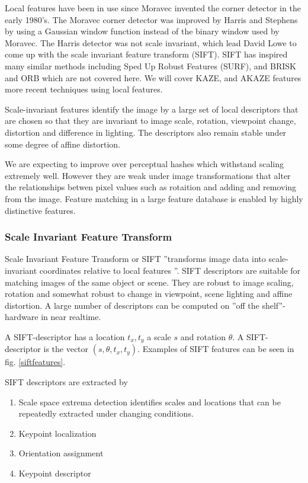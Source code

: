 \documentclass[english,12pt,a4paper,pdftex,elec,utf8]{aaltothesis}
\begin{document}
Local features have been in use since Moravec invented the corner detector in the early 1980's. The Moravec corner detector was improved by Harris and Stephens by using a Gaussian window function instead of the binary window used by Moravec. The Harris detector was not scale invariant, which lead David Lowe to come up with the scale invariant feature transform (SIFT). SIFT has inspired many similar methods including Sped Up Robust Features (SURF), and BRISK and ORB which are not covered here. We will cover KAZE, and AKAZE features more recent techniques using local features.

Scale-invariant features identify the image by a large set of local descriptors that are chosen so that they are invariant to image scale, rotation, viewpoint change, distortion and difference in lighting. The descriptors also remain stable under some degree of affine distortion. \cite{Lowe2004}

We are expecting to improve over perceptual hashes which withstand scaling extremely well. However they are weak under image transformations that alter the relationships betwen pixel values such as rotaition and adding and removing from the image. Feature matching in a large feature database is enabled by highly distinctive features.

\subsubsection{Scale Invariant Feature Transform}
Scale Invariant Feature Transform or SIFT ''transforms image data into scale-invariant coordinates relative to local features \cite{Lowe2004}''. SIFT descriptors are suitable for matching images of the same object or scene. They are robust to image scaling, rotation and somewhat robust to change in viewpoint, scene lighting and affine distortion. A large number of descriptors can be computed on ''off the shelf''-hardware in near realtime. \cite{Lowe2004}

A SIFT-descriptor has a location $t_x, t_y$ a scale $s$ and rotation $\theta$. A SIFT-descriptor is the vector $(s, \theta, t_x, t_y)$. Examples of SIFT features can be seen in fig. \ref{siftfeatures}.

SIFT descriptors are extracted by

\begin{enumerate}
\item Scale space extrema detection identifies scales and locations that can be repeatedly extracted under changing conditions.
\item Keypoint localization
\item Orientation assignment
\item Keypoint descriptor
\end{enumerate}
\cite{Lowe2004}
\end{document}
